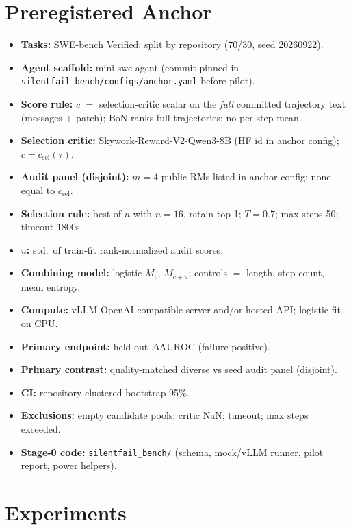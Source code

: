 \documentclass[11pt]{article}
\newcommand{\DeltaAUROC}{\Delta\mathrm{AUROC}}
\begin{document}
\section{Preregistered Anchor}

\begin{itemize}[leftmargin=*,itemsep=1pt]
  \item \textbf{Tasks:} SWE-bench Verified; split by repository (70/30, seed 20260922).
  \item \textbf{Agent scaffold:} mini-swe-agent (commit pinned in \texttt{silentfail\_bench/configs/anchor.yaml} before pilot).
  \item \textbf{Score rule:} $c$ $=$ selection-critic scalar on the \emph{full} committed trajectory text (messages + patch); BoN ranks full trajectories; no per-step mean.
  \item \textbf{Selection critic:} Skywork-Reward-V2-Qwen3-8B (HF id in anchor config); $c=c_{\mathrm{sel}}(\tau)$.
  \item \textbf{Audit panel (disjoint):} $m{=}4$ public RMs listed in anchor config; none equal to $c_{\mathrm{sel}}$.
  \item \textbf{Selection rule:} best-of-$n$ with $n{=}16$, retain top-1; $T{=}0.7$; max steps 50; timeout 1800s.
  \item \textbf{$u$:} std.\ of train-fit rank-normalized audit scores.
  \item \textbf{Combining model:} logistic $M_{c}$, $M_{c{+}u}$; controls $=$ length, step-count, mean entropy.
  \item \textbf{Compute:} vLLM OpenAI-compatible server and/or hosted API; logistic fit on CPU.
  \item \textbf{Primary endpoint:} held-out $\DeltaAUROC$ (failure positive).
  \item \textbf{Primary contrast:} quality-matched diverse vs seed audit panel (disjoint).
  \item \textbf{CI:} repository-clustered bootstrap 95\%.
  \item \textbf{Exclusions:} empty candidate pools; critic NaN; timeout; max steps exceeded.
  \item \textbf{Stage-0 code:} \texttt{silentfail\_bench/} (schema, mock/vLLM runner, pilot report, power helpers).
\end{itemize}

\section{Experiments}
\end{document}
